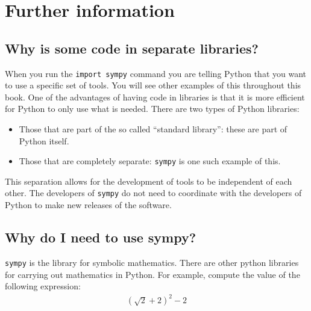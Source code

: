 \section{Further information}
\label{\detokenize{tools-for-mathematics/02-algebra/why/main:further-information}}\label{\detokenize{tools-for-mathematics/02-algebra/why/main::doc}}

\subsection{Why is some code in separate libraries?}
\label{\detokenize{tools-for-mathematics/02-algebra/why/main:why-is-some-code-in-separate-libraries}}

When you run the \texttt{import sympy} command you are telling Python that you want to use
a specific set of tools. You will see other examples of this throughout this
book.
One of the advantages of having code in libraries is that it is more efficient
for Python to only use what is needed.
There are two types of Python libraries:
\begin{itemize}
\item 

Those that are part of the so called ``standard library'': these are part of
Python itself.

\item 

Those that are completely separate: \texttt{sympy} is one such example of this.

\end{itemize}


This separation allows for the development of tools to be independent of each
other. The developers of \texttt{sympy} do not need to coordinate with the developers
of Python to make new releases of the software.


\subsection{Why do I need to use sympy?}
\label{\detokenize{tools-for-mathematics/02-algebra/why/main:why-do-we-need-to-use-sympy}}

\texttt{sympy} is the library for symbolic mathematics. There are other python libraries
for carrying out mathematics in Python.
For example, compute the value of the following expression:
\begin{equation*}
\begin{split}
    (\sqrt{2} + 2) ^ 2 - 2
\end{split}
\end{equation*}

